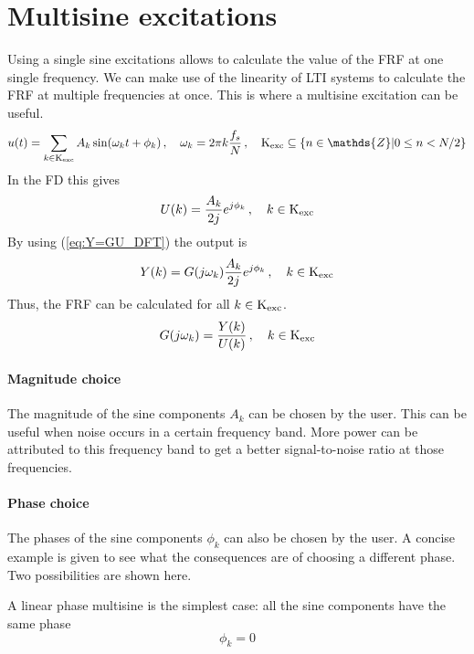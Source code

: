 \section{Multisine excitations}
Using a single sine excitations allows to calculate the value of the FRF at one single frequency. We can make use of the linearity of LTI systems to calculate the FRF at multiple frequencies at once. This is where a multisine excitation can be useful.
\begin{equation*}
    u(t) =  \sum_{k \in \kexc} A_k \sin(\omega_k t + \phi_k) \,,\quad \omega_k = 2 \pi k \frac{f_s}{N} \,,\quad \kexc \subseteq \{n \in \mathds{Z} | 0 \leq n < N/2 \}
\end{equation*}
In the FD this gives
\begin{equation*}
    U(k) = \frac{A_k}{2j} e^{j \phi_k} \,,\quad k \in \text{K}_{\text{exc}}
\end{equation*}
By using (\ref{eq:Y=GU_DFT}) the output is
\begin{equation*}
    Y(k) = G(j \omega_k) \frac{A_k}{2j} e^{j \phi_k} \,,\quad k \in \text{K}_{\text{exc}}
\end{equation*}
Thus, the FRF can be calculated for all $k \in \text{K}_{\text{exc}}$.
\begin{equation}
    G(j\omega_k) = \frac{Y(k)}{U(k)} \,,\quad k \in \text{K}_{\text{exc}}
    \label{eq:G=Y/U_MS}
\end{equation}

\paragraph{Magnitude choice}
The magnitude of the sine components $A_k$ can be chosen by the user. This can be useful when noise occurs in a certain frequency band. More power can be attributed to this frequency band to get a better signal-to-noise ratio at those frequencies.

\paragraph{Phase choice}
The phases of the sine components $\phi_k$ can also be chosen by the user. A concise example is given to see what the consequences are of choosing a different phase. Two possibilities are shown here.

A linear phase multisine is the simplest case: all the sine components have the same phase 
\begin{equation*}
    \phi_k=0
\end{equation*}

